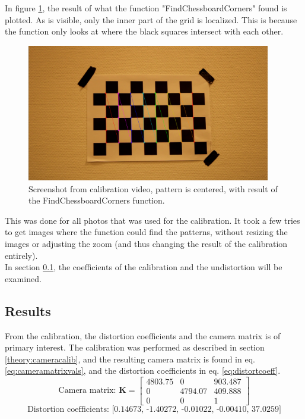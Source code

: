 In figure \ref{fig:calibpattern1marked}, the result of what the function "FindChessboardCorners" found is plotted. As is visible, only the inner part of the grid is localized. This is because the function only looks at where the black squares intersect with each other. 
\begin{figure}[h]
    \centering
        \includegraphics[width=0.95\textwidth]{figures/CameraCalibration/im1_marked.png}
        \caption{Screenshot from calibration video, pattern is centered, with result of the FindChessboardCorners function. }
    \label{fig:calibpattern1marked}
\end{figure}
This was done for all photos that was used for the calibration. It took a few tries to get images where the function could find the patterns, without resizing the images or adjusting the zoom (and thus changing the result of the calibration entirely).\\ 

In section \ref{result:cameracalib}, the coefficients of the calibration and the undistortion will be examined. 





\subsection{Results} \label{result:cameracalib}
From the calibration, the distortion coefficients and the camera matrix is of primary interest. The calibration was performed as described in section \ref{theory:cameracalib}, and the resulting camera matrix is found in eq. \ref{eq:cameramatrixvals}, and the distortion coefficients in eq. \ref{eq:distortcoeff}.
\begin{equation}
\text{Camera matrix: }\boldsymbol{K} = \left[\begin{array}{ccc}
4803.75 & 0 & 903.487 \\
0 & 4794.07 & 409.888 \\
0 & 0 & 1
\end{array}\right]
\label{eq:cameramatrixvals}
\end{equation}
\begin{equation}
    \text{Distortion coefficients: [0.14673, -1.40272, -0.01022, -0.00410, 37.0259]} 
    \label{eq:distortcoeff}
\end{equation}

